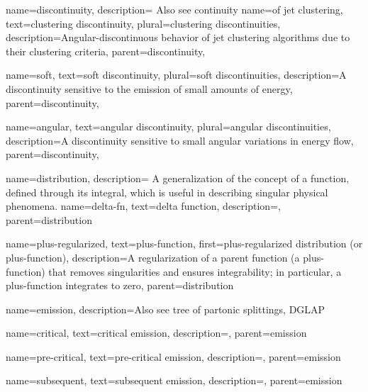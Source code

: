 {
    name=discontinuity,
    description={
        Also see continuity
    }
}
    {
        name=of jet clustering,
        text={clustering discontinuity},
        plural={clustering discontinuities},
        description={Angular-discontinuous behavior of jet clustering algorithms due to their clustering criteria},
        parent=discontinuity,
    }

    {
        name=soft,
        text=soft discontinuity,
        plural=soft discontinuities,
        description={A discontinuity sensitive to the emission of small amounts of energy},
        parent=discontinuity,
    }

    {
        name=angular,
        text={angular discontinuity},
        plural={angular discontinuities},
        description={A discontinuity sensitive to small angular variations in energy flow},
        parent=discontinuity,
    }

{
    name=distribution,
    description={
        A generalization of the concept of a function, defined through its integral, which is useful in describing singular physical phenomena.
    }
}
    {
      name=delta-fn,
      text=delta function,
      description={},
      parent=distribution
    }

    {
      name=plus-regularized,
      text=plus-function,
      first=plus-regularized distribution (or plus-function),
      description={A regularization of a parent function (a plus-function) that removes singularities and ensures integrability;
      in particular, a plus-function integrates to zero},
      parent=distribution
    }



{
    name=emission,
    description={Also see tree of partonic splittings, DGLAP}
}

    {
        name=critical,
        text=critical emission,
        description={},
        parent=emission
    }

    {
        name=pre-critical,
        text=pre-critical emission,
        description={},
        parent=emission
    }

    {
        name=subsequent,
        text=subsequent emission,
        description={},
        parent=emission
    }



